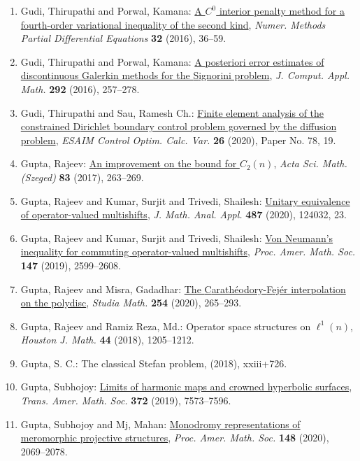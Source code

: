 \begin{enumerate}
\item Gudi, Thirupathi and Porwal, Kamana: \href{https://doi.org/10.1002/num.21983}{A {$C^0$} interior penalty method for a fourth-order
variational inequality of the second kind}, \emph{Numer. Methods Partial Differential Equations} {\bf 32} (2016), 36--59.
\item Gudi, Thirupathi and Porwal, Kamana: \href{https://doi.org/10.1016/j.cam.2015.07.008}{A posteriori error estimates of discontinuous {G}alerkin
methods for the {S}ignorini problem}, \emph{J. Comput. Appl. Math.} {\bf 292} (2016), 257--278.
\item Gudi, Thirupathi and Sau, Ramesh Ch.: \href{https://doi.org/10.1051/cocv/2019068}{Finite element analysis of the constrained {D}irichlet
boundary control problem governed by the diffusion problem}, \emph{ESAIM Control Optim. Calc. Var.} {\bf 26} (2020), Paper No. 78, 19.
\item Gupta, Rajeev: \href{https://doi.org/10.14232/actasm-015-088-4}{An improvement on the bound for {$C_2(n)$}}, \emph{Acta Sci. Math. (Szeged)} {\bf 83} (2017), 263--269.
\item Gupta, Rajeev and Kumar, Surjit and Trivedi, Shailesh: \href{https://doi.org/10.1016/j.jmaa.2020.124032}{Unitary equivalence of operator-valued multishifts}, \emph{J. Math. Anal. Appl.} {\bf 487} (2020), 124032, 23.
\item Gupta, Rajeev and Kumar, Surjit and Trivedi, Shailesh: \href{https://doi.org/10.1090/proc/14410}{Von {N}eumann's inequality for commuting operator-valued
multishifts}, \emph{Proc. Amer. Math. Soc.} {\bf 147} (2019), 2599--2608.
\item Gupta, Rajeev and Misra, Gadadhar: \href{https://doi.org/10.4064/sm190314-18-8}{The {C}arath\'{e}odory-{F}ej\'{e}r interpolation on the polydisc}, \emph{Studia Math.} {\bf 254} (2020), 265--293.
\item Gupta, Rajeev and Ramiz Reza, Md.: Operator space structures on {$\ell^1(n)$}, \emph{Houston J. Math.} {\bf 44} (2018), 1205--1212.
\item Gupta, S. C.: The classical {S}tefan problem, \emph{} {\bf } (2018), xxiii+726.
\item Gupta, Subhojoy: \href{https://doi.org/10.1090/tran/7777}{Limits of harmonic maps and crowned hyperbolic surfaces}, \emph{Trans. Amer. Math. Soc.} {\bf 372} (2019), 7573--7596.
\item Gupta, Subhojoy and Mj, Mahan: \href{https://doi.org/10.1090/proc/14866}{Monodromy representations of meromorphic projective
structures}, \emph{Proc. Amer. Math. Soc.} {\bf 148} (2020), 2069--2078.

\end{enumerate}
